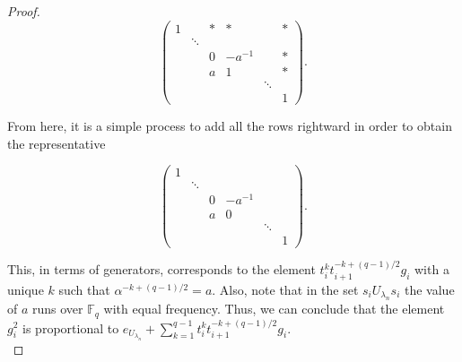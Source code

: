 \documentclass[12pt,reqno]{amsart}
\theoremstyle{definition}
\theoremstyle{remark}
\numberwithin{equation}{section}
\newcommand{\CC}{\mathbb{C}}
\newcommand{\GL}[1]{GL_{#1}(\mathbb{F}_q)}
\def\IM#1{\textcolor[rgb]{0.00,0.00,0.75}{[I: #1]}}
\begin{document}
\begin{proof}
\[\begin{pmatrix}
1 &  & * & * &  & * \\
 & \ddots &  &  &  &  \\
 &  & 0 & -a^{-1} &  & * \\
 &  & a & 1 &  & * \\
 &  &  &  & \ddots &  \\
 &  &  &  &  & 1 
\end{pmatrix}.\]

From here, it is a simple process to add all the rows rightward in order to obtain the representative 

\[\begin{pmatrix}
1 &  &  &  &  &  \\
 & \ddots &  &  &  &  \\
 &  & 0 & -a^{-1} &  &  \\
 &  & a & 0 &  &  \\
 &  &  &  & \ddots &  \\
 &  &  &  &  & 1 
\end{pmatrix}.\]

This, in terms of generators, corresponds to the element $t_i^k t_{i+1}^{-k+(q-1)/2} g_i$ with a unique $k$ such that $\alpha^{-k+(q-1)/2}=a$. Also, note that in the set $s_i U_{\lambda_n} s_i$ the value of $a$ runs over $\mathbb{F}_q$ with equal frequency. Thus, we can conclude that the element $g_i^2$ is proportional to $e_{U_{\lambda_n}} + \sum_{k=1}^{q-1}t_i^kt_{i+1}^{-k+(q-1)/2}g_i$.\\ %


\end{proof}
\end{document}
